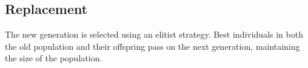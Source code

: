 \subsection{Replacement}\label{ga:rep}

The new generation is selected using an elitist strategy. Best individuals in both the old population and their offspring pass on the next generation, maintaining the size of the population.


